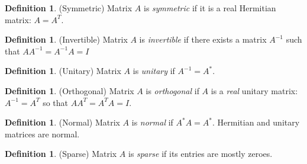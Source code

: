 \documentclass[12pt]{article}
\numberwithin{equation}{section} %
\theoremstyle{plain}
\theoremstyle{definition}
\newtheorem{defn}[thm]{Definition}
\theoremstyle{remark}
\begin{document}
\begin{defn}{(Symmetric)}
Matrix $A$ is \emph{symmetric} if it is a real Hermitian matrix:
$A=A^T$.
\end{defn}

\begin{defn}{(Invertible)}
Matrix $A$ is \emph{invertible} if there exists a matrix $A^{-1}$ such
that $A A^{-1} = A^{-1}A=I$
\end{defn}

\begin{defn}{(Unitary)}
Matrix $A$ is \emph{unitary} if $A^{-1} = A^*$.
\end{defn}

\begin{defn}{(Orthogonal)}
Matrix $A$ is \emph{orthogonal} if $A$ is a \emph{real} unitary matrix:
$A^{-1} = A^T$ so that $AA^T = A^T A = I$.
\end{defn}

\begin{defn}{(Normal)}
Matrix $A$ is \emph{normal} if $A^* A = A^*$. Hermitian and unitary
matrices are normal.
\end{defn}

\begin{defn}{(Sparse)}
Matrix $A$ is \emph{sparse} if its entries are mostly zeroes.
\end{defn}
\end{document}
